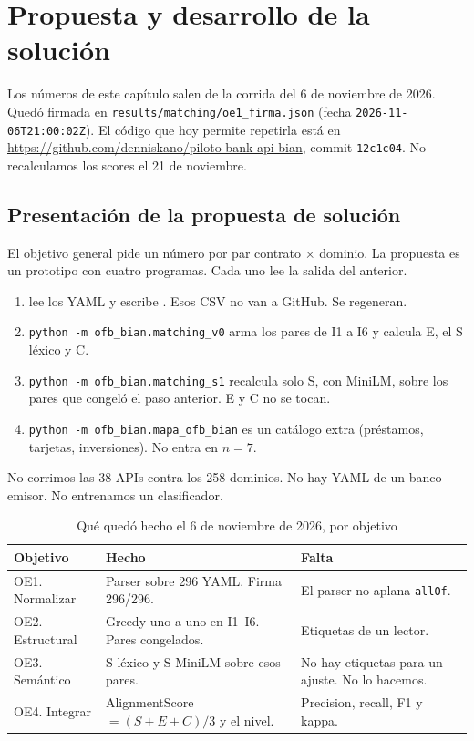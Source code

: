 \chapter{Propuesta y desarrollo de la solución}

Los números de este capítulo salen de la corrida del 6 de noviembre de 2026. Quedó firmada en \texttt{results/matching/oe1\_firma.json} (fecha \texttt{2026-11-06T21:00:02Z}). El código que hoy permite repetirla está en \url{https://github.com/denniskano/piloto-bank-api-bian}, commit \texttt{12c1c04}. No recalculamos los scores el 21 de noviembre.

\section{Presentación de la propuesta de solución}

El objetivo general pide un número por par contrato $\times$ dominio. La propuesta es un prototipo con cuatro programas. Cada uno lee la salida del anterior.

\begin{enumerate}
  \item {} lee los YAML y escribe . Esos CSV no van a GitHub. Se regeneran.
  \item \texttt{python -m ofb\_bian.matching\_v0} arma los pares de I1 a I6 y calcula E, el S léxico y C.
  \item \texttt{python -m ofb\_bian.matching\_s1} recalcula solo S, con MiniLM, sobre los pares que congeló el paso anterior. E y C no se tocan.
  \item \texttt{python -m ofb\_bian.mapa\_ofb\_bian} es un catálogo extra (préstamos, tarjetas, inversiones). No entra en $n = 7$.
\end{enumerate}

No corrimos las 38 APIs contra los 258 dominios. No hay YAML de un banco emisor. No entrenamos un clasificador.

\begin{table}[ht]
  \centering
  \caption{Qué quedó hecho el 6 de noviembre de 2026, por objetivo}
  \label{tab:oe}
  \small
  \begin{tabular}{@{}p{}p{}p{}@{}}
    \toprule
    Objetivo & Hecho & Falta \\
    \midrule
    OE1. Normalizar & Parser sobre 296 YAML. Firma 296/296. & El parser no aplana \texttt{allOf}. \\
    OE2. Estructural & Greedy uno a uno en I1--I6. Pares congelados. & Etiquetas de un lector. \\
    OE3. Semántico & S léxico y S MiniLM sobre esos pares. & No hay etiquetas para un ajuste. No lo hacemos. \\
    OE4. Integrar & AlignmentScore $= (S+E+C)/3$ y el nivel. & Precision, recall, F1 y kappa. \\
    \bottomrule
  \end{tabular}
\end{table}

